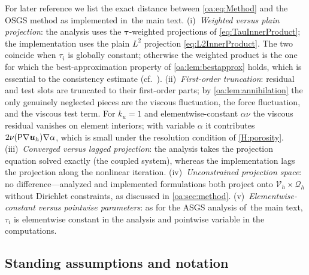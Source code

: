 \begin{remark}
\label{oa:rem:analyzed}
For later reference we list the exact distance between \cref{oa:eq:Method} and the OSGS
method as implemented in~the main text. (i)~\emph{Weighted versus plain projection}:
the analysis uses the $\boldsymbol{\tau}$-weighted projections of
\cref{eq:TauInnerProduct}; the implementation uses the plain $L^2$ projection \cref{eq:L2InnerProduct}. The two
coincide when $\tau_i$ is globally constant; otherwise the weighted product is the one
for which the best-approximation property of \cref{oa:lem:bestapprox} holds, which is
essential to the consistency estimate (cf.~\cite[Remark~4]{codina2008analysis}).
(ii)~\emph{First-order truncation}: residual and test slots are truncated to their
first-order parts; by \cref{oa:lem:annihilation} the only genuinely neglected pieces are
the viscous fluctuation, the force fluctuation, and the viscous test term. For $k_u = 1$
and elementwise-constant $\alpha\nu$ the viscous residual vanishes on element interiors;
with variable $\alpha$ it contributes $2\nu(\mathsf{P}\nabla\boldsymbol{u}_h)\nabla\alpha$, which is
small under the resolution condition of \cref{H:porosity}. (iii)~\emph{Converged versus lagged
projection}: the analysis takes the projection equation solved exactly (the coupled
system), whereas the implementation lags the projection along the nonlinear iteration.
(iv)~\emph{Unconstrained projection space}: no difference---analyzed and implemented
formulations both project onto $\mathcal{V}_h\times\mathcal{Q}_h$ without Dirichlet
constraints, as discussed in \cref{oa:sec:method}.
(v)~\emph{Elementwise-constant versus pointwise parameters}: as for the ASGS analysis
of~the main text, $\tau_{i}$ is elementwise constant in the analysis and pointwise
variable in the computations.
\end{remark}

\subsection{Standing assumptions and notation}
\label{oa:sec:hypotheses}

